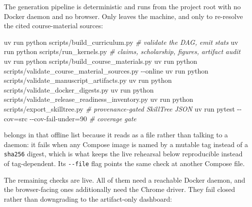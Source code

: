 \documentclass[
  english,
]{article}
\newenvironment{Shaded}{}{}
\newcommand{\AttributeTok}[1]{\textcolor[rgb]{0.49,0.56,0.16}{#1}}
\newcommand{\CommentTok}[1]{\textcolor[rgb]{0.38,0.63,0.69}{\textit{#1}}}
\newcommand{\ExtensionTok}[1]{#1}
\newcommand{\NormalTok}[1]{#1}
\newcommand{\OperatorTok}[1]{\textcolor[rgb]{0.40,0.40,0.40}{#1}}
\begin{document}
The generation pipeline is deterministic and runs from the project root
with no Docker daemon and no browser. Only
 leaves the
machine, and only to re-resolve the cited course-material sources:

\begin{Shaded}
\begin{Highlighting}[]
\ExtensionTok{uv}\NormalTok{ run python scripts/build\_curriculum.py   }\CommentTok{\# validate the DAG, emit stats}
\ExtensionTok{uv}\NormalTok{ run python scripts/run\_kernels.py        }\CommentTok{\# claims, scholarship, figures, artifact audit}
\ExtensionTok{uv}\NormalTok{ run python scripts/build\_course\_materials.py}
\ExtensionTok{uv}\NormalTok{ run python scripts/validate\_course\_material\_sources.py }\AttributeTok{{-}{-}online}
\ExtensionTok{uv}\NormalTok{ run python scripts/validate\_manuscript\_artifacts.py}
\ExtensionTok{uv}\NormalTok{ run python scripts/validate\_docker\_digests.py}
\ExtensionTok{uv}\NormalTok{ run python scripts/validate\_release\_readiness\_inventory.py}
\ExtensionTok{uv}\NormalTok{ run python scripts/export\_skilltree.py   }\CommentTok{\# provenance{-}gated SkillTree JSON}
\ExtensionTok{uv}\NormalTok{ run pytest }\AttributeTok{{-}{-}cov}\OperatorTok{=}\NormalTok{src }\AttributeTok{{-}{-}cov{-}fail{-}under}\OperatorTok{=}\NormalTok{90 }\CommentTok{\# coverage gate}
\end{Highlighting}
\end{Shaded}

 belongs in that offline list
because it reads  as a file rather than
talking to a daemon: it fails when any Compose image is named by a
mutable tag instead of a \texttt{sha256} digest, which is what keeps the
live rehearsal below reproducible instead of tag-dependent. Its
\texttt{-\/-file} flag points the same check at another Compose file.

The remaining checks are live. All of them need a reachable Docker
daemon, and the browser-facing ones additionally need the
 Chrome driver. They fail closed rather than
downgrading to the artifact-only dashboard:
\end{document}
